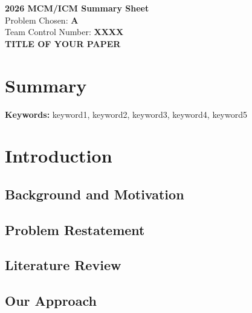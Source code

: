 \documentclass[11pt,letterpaper]{article}
\begin{document}
\begin{titlepage}
\begin{center}
\vspace*{2cm}
\textbf{\LARGE 2026 MCM/ICM Summary Sheet} \\[1cm]
{\large Problem Chosen: \textbf{A}} \\[0.5cm]
{\large Team Control Number: \textbf{XXXX}} \\[2cm]
{\Huge \textbf{TITLE OF YOUR PAPER}} \\[2cm]
\end{center}

\section*{Summary}


\textbf{Keywords:} keyword1, keyword2, keyword3, keyword4, keyword5

\end{titlepage}

\newpage
\tableofcontents
\newpage


\section{Introduction}


\subsection{Background and Motivation}

\subsection{Problem Restatement}

\subsection{Literature Review}

\subsection{Our Approach}
\end{document}
